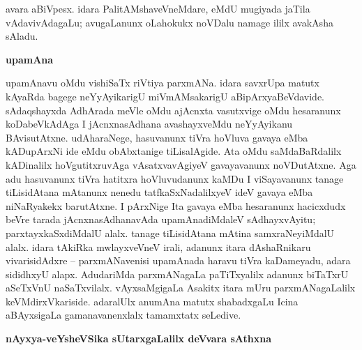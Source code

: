 avara aBiVpesx. idara PalitAMshaveVneMdare, eMdU mugiyada jaTila vAdavivAdagaLu; avugaLanunx oLa\-hokukx noVDalu namage ililx avakAsha sAladu.

\bigskip
\begin{center}
{\Large\bf upamAna}
\end{center}

upamAnavu oMdu vishiSaTx riVtiya parxmANa. idara savxrUpa matutx kAyaRda bagege neYyAyikarigU miVmAMsakarigU aBipArxyaBeVdavide. sAdaqshayxda AdhArada meVle oMdu ajAcnxta vasutxvige oMdu hesaranunx koDabeVkAdAga I jAcnxnasAdhana avashayxveMdu neYyAyikanu BAvisutAtxne. udAharaNege, hasuvanunx tiVra hoVluva gavaya eMba kADupArxNi ide eMdu obAbxtanige tiLisalAgide. Ata oMdu saMdaBaRdalilx kADinalilx hoVgutitxruvAga vAsatxvavAgiyeV gavayavanunx noVDutAtxne. Aga adu hasuvanunx tiVra hatitxra hoVluvudanunx kaMDu I viSayavanunx tanage tiLisidAtana mAtanunx nenedu tatfkaSxNadalilxyeV ideV gavaya eMba niNaRyakekx barutAtxne. I pArxNige Ita gavaya eMba hesaranunx hacicxdudx beVre tarada jAcnxnasAdhanavAda upamAnadiMdaleV sAdhayxvAyitu; parxtayxkaSxdiMdalU alalx. tanage tiLisidAtana mAtina samxraNeyiMdalU alalx. idara tAkiRka mwlayxveVneV irali, adanunx itara dAshaRnikaru vivarisidAdxre -- parxmANavenisi upamAnada haravu tiVra kaDameyadu, adara sididhxyU alapx. AdudariMda parxmANagaLa paTiTxyalilx adanunx biTaTxrU aSeTxVnU naSaTxvilalx. vAyxsaMgigaLa Asakitx itara mUru parxmANagaLalilx keVMdirxVkariside. adaralUlx anumAna matutx shabadxgaLu Icina aBAyxsigaLa gamanavanenxlalx tamamxtatx seLedive.

\bigskip
\begin{center}
{\Large\bf nAyxya-veYsheVSika sUtarxgaLalilx deVvara sAthxna}
\end{center}

